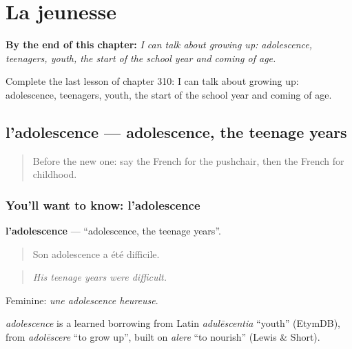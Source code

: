 
\chapter{La jeunesse}
\label{ch:fr-la-jeunesse}

\begin{chapteropening}
\textbf{By the end of this chapter:} \emph{I can talk about growing up: adolescence, teenagers, youth, the start of the school year and coming of age.}

Complete the last lesson of chapter 310: I can talk about growing up: adolescence, teenagers, youth, the start of the school year and coming of age.
\end{chapteropening}

\section[l'adolescence]{l'adolescence — adolescence, the teenage years}

\label{lesson:FR-C310-adolescence}



\begin{quote}
Before the new one: say the French for the pushchair, then the French for childhood.
\end{quote}

\subsection*{You'll want to know: l'adolescence}
\textbf{l'adolescence} — \textquotedblleft{}adolescence, the teenage years\textquotedblright{}.

\begin{quote}
Son adolescence a été difficile.
\end{quote}

\begin{quote}
\emph{His teenage years were difficult.}
\end{quote}

Feminine: \emph{une adolescence heureuse}.

\begin{cousinweb}
\emph{adolescence} is a learned borrowing from Latin \emph{adulēscentia} \textquotedblleft{}youth\textquotedblright{} (EtymDB), from \emph{adolēscere} \textquotedblleft{}to grow up\textquotedblright{}, built on \emph{alere} \textquotedblleft{}to nourish\textquotedblright{} (Lewis \& Short).
\end{cousinweb}

